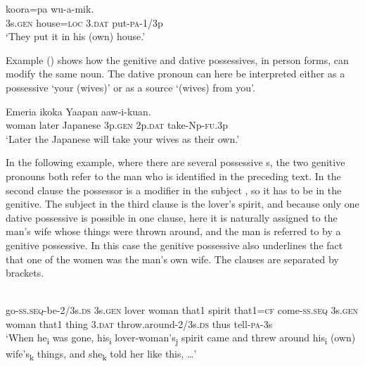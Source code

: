 \ea%
\label{ex:x593}
\gll {} koora=pa  wu-a-mik. \\
3s.\textsc{gen} house=\textsc{loc} 3.\textsc{dat} put-\textsc{pa}-1/3p\\
\glt`They put it in his (own) house.'
\z

Example () shows how the genitive and dative possessives, in  person forms, can modify the same noun. The dative pronoun can here be interpreted either as a possessive `your (wives)' or as a source `(wives) from you'.

\ea%
\label{ex:x594}
\gll Emeria ikoka Yaapan   aaw-i-kuan. \\
woman later Japanese 3p.\textsc{gen} 2p.\textsc{dat} take-Np-\textsc{fu}.3p\\
\glt`Later the Japanese will take your wives as their own.'
\z

In the following example, where there are several possessive s, the two genitive pronouns both refer to the man who is identified in the preceding text. In the second clause the possessor is a modifier in the subject , so it has to be in the genitive. The subject in the third clause is the lover's spirit, and because only one dative possessive is possible in one clause, here it is naturally assigned to the man's wife whose things were thrown around, and the man is referred to by a genitive possessive. In this case the genitive possessive also underlines the fact that one of the women was the man's own wife. The clauses are separated by brackets.

\ea%
\label{ex:x1318}
\\
go-\textsc{ss}.\textsc{seq}-be-2/3s.\textsc{ds} 3s.\textsc{gen} lover woman that1 spirit that1=\textsc{cf} come-\textsc{ss}.\textsc{seq} 3s.\textsc{gen} woman that1 thing 3.\textsc{dat} throw.around-2/3s.\textsc{ds} thus tell-\textsc{pa}-3s\\
\glt`When he\textsubscript{i} was gone, his\textsubscript{i} lover-woman's\textsubscript{j} spirit came and threw around his\textsubscript{i} (own) wife's\textsubscript{k} things, and she\textsubscript{k} told her like this, {\dots}'
\z

